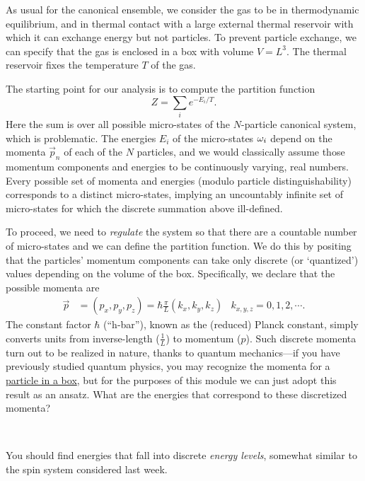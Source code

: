 As usual for the canonical ensemble, we consider the gas to be in thermodynamic equilibrium, and in thermal contact with a large external thermal reservoir with which it can exchange energy but not particles.
To prevent particle exchange, we can specify that the gas is enclosed in a box with volume $V = L^3$.
The thermal reservoir fixes the temperature $T$ of the gas.

The starting point for our analysis is to compute the partition function
\begin{equation*}
  Z = \sum_i e^{-E_i / T}.
\end{equation*}
Here the sum is over all possible micro-states of the $N$-particle canonical system, which is problematic.
The energies $E_i$ of the micro-states $\omega_i$ depend on the momenta $\vec{p}_n$ of each of the $N$ particles, and we would classically assume those momentum components and energies to be continuously varying, real numbers.
Every possible set of momenta and energies (modulo particle distinguishability) corresponds to a distinct micro-states, implying an uncountably infinite set of micro-states for which the discrete summation above ill-defined.

To proceed, we need to \textit{regulate} the system so that there are a countable number of micro-states and we can define the partition function.
We do this by positing that the particles' momentum components can take only discrete (or `quantized') values depending on the volume of the box.
Specifically, we declare that the possible momenta are
\begin{align*}
  \vec p & = (p_x, p_y, p_z) = \hbar \frac{\pi}{L} (k_x, k_y, k_z) &
  k_{x, y, z} = 0, 1, 2, \cdots.
\end{align*}
The constant factor $\hbar$ (``h-bar''), known as the (reduced) Planck constant, simply converts units from inverse-length ($\frac{1}{L}$) to momentum ($p$).
Such discrete momenta turn out to be realized in nature, thanks to quantum mechanics---if you have previously studied quantum physics, you may recognize the momenta for a \href{https://en.wikipedia.org/wiki/Particle_in_a_box}{particle in a box}, but for the purposes of this module we can just adopt this result as an ansatz.
What are the energies that correspond to these discretized momenta?
\begin{mdframed}
  \ \\[50 pt]
\end{mdframed}
You should find energies that fall into discrete \textit{energy levels}, somewhat similar to the spin system considered last week.

